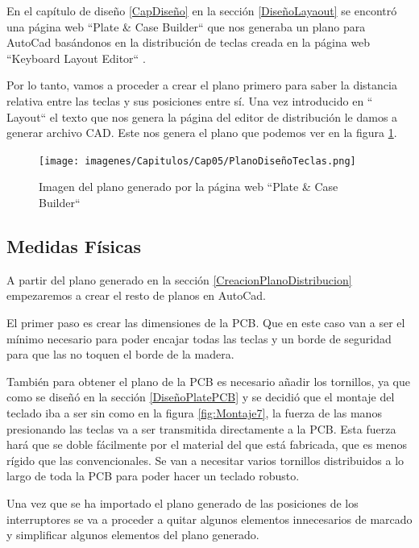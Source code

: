En el capítulo de diseño \ref{CapDiseño} en la sección \ref{DiseñoLayaout} se encontró una página web ``Plate \& Case Builder`` \cite{builder-swillkb} que nos generaba un plano para AutoCad basándonos en la distribución de teclas creada en la página web ``Keyboard Layout Editor`` \cite{Layout-Editor}.

Por lo tanto, vamos a proceder a crear el plano primero para saber la distancia relativa entre las teclas y sus posiciones entre sí. Una vez introducido en `` Layout`` el texto que nos genera la página del editor de distribución le damos a generar archivo CAD. Este nos genera el plano que podemos ver en la figura \ref{fig:PlanoDistribucionLayout}.

\begin{figure}[H]
    \centering
    \texttt{[image: imagenes/Capitulos/Cap05/PlanoDiseñoTeclas.png]}
    \caption{Imagen del plano generado por la página web ``Plate \& Case Builder`` \cite{builder-swillkb}}
    \label{fig:PlanoDistribucionLayout}
\end{figure}

\subsection{Medidas Físicas} \label{MedidasFisicas}

A partir del plano generado en la sección \ref{CreacionPlanoDistribucion} empezaremos a crear el resto de planos en AutoCad.

El primer paso es crear las dimensiones de la \gls{PCB}. Que en este caso van a ser el mínimo necesario para poder encajar todas las teclas y un borde de seguridad para que las  no toquen el borde de la madera.

También para obtener el plano de la \gls{PCB} es necesario añadir los tornillos, ya que como se diseñó en la sección \ref{DiseñoPlatePCB} y se decidió que el montaje del teclado iba a ser sin  como en la figura \ref{fig:Montaje7}, la fuerza de las manos presionando las teclas va a ser transmitida directamente a la \gls{PCB}. Esta fuerza hará que se doble fácilmente por el material del que está fabricada, que es menos rígido que las  convencionales. Se van a necesitar varios tornillos distribuidos a lo largo de toda la \gls{PCB} para poder hacer un teclado robusto.

Una vez que se ha importado el plano generado de las posiciones de los interruptores se va a proceder a quitar algunos elementos innecesarios de marcado y simplificar algunos elementos del plano generado.

